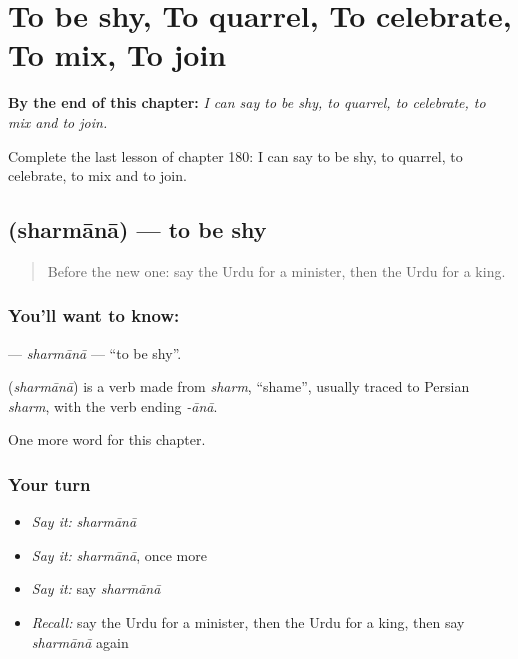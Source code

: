 
\chapter{To be shy, To quarrel, To celebrate, To mix, To join}
\label{ch:ur-to-be-shy-to-quarrel-to-celebrate-to-mix-to-join}

\begin{chapteropening}
\textbf{By the end of this chapter:} \emph{I can say to be shy, to quarrel, to celebrate, to mix and to join.}

Complete the last lesson of chapter 180: I can say to be shy, to quarrel, to celebrate, to mix and to join.
\end{chapteropening}

\section[\texorpdfstring{\ur{شرمانا} (sharmānā)}{شرمانا (sharmānā)}]{ (sharmānā) — to be shy}

\label{lesson:UR-C180-sharmana}



\begin{quote}
Before the new one: say the Urdu for a minister, then the Urdu for a king.
\end{quote}

\subsection*{You'll want to know: }
\textbf{} — \emph{sharmānā} — \textquotedblleft{}to be shy\textquotedblright{}.

\begin{cousinweb}
\textbf{} (\emph{sharmānā}) is a verb made from \emph{sharm}, \textquotedblleft{}shame\textquotedblright{}, usually traced to Persian \emph{sharm}, with the verb ending \emph{-ānā}.
\end{cousinweb}

\begin{grammarlens}[title={What you've built}]
One more word for this chapter.
\end{grammarlens}

\subsection*{Your turn}
\begin{itemize}
\raggedright
  \item \emph{Say it:} \emph{sharmānā}
  \item \emph{Say it:} \emph{sharmānā}, once more
  \item \emph{Say it:} say \emph{sharmānā}
  \item \emph{Recall:} say the Urdu for a minister, then the Urdu for a king, then say \emph{sharmānā} again
\end{itemize}

